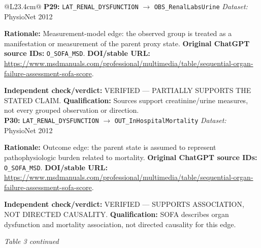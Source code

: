 \begin{tabular}{@{}L{23.4cm}@{}}
\addlinespace[2pt]
\midrule
\textbf{P29:} \nolinkurl{LAT_RENAL_DYSFUNCTION} $\rightarrow$ \nolinkurl{OBS_RenalLabsUrine} \hfill \textit{Dataset:} PhysioNet 2012\par\textbf{Rationale:} Measurement-model edge: the observed group is treated as a manifestation or measurement of the parent proxy state. \textbf{Original ChatGPT source IDs:} \nolinkurl{O_SOFA_MSD}. \textbf{DOI/stable URL:} \url{https://www.msdmanuals.com/professional/multimedia/table/sequential-organ-failure-assessment-sofa-score}.\par\textbf{Independent check/verdict:} VERIFIED --- PARTIALLY SUPPORTS THE STATED CLAIM. \textbf{Qualification:} Sources support creatinine/urine measures, not every grouped observation or direction. \\
\addlinespace[2pt]
\midrule
\textbf{P30:} \nolinkurl{LAT_RENAL_DYSFUNCTION} $\rightarrow$ \nolinkurl{OUT_InHospitalMortality} \hfill \textit{Dataset:} PhysioNet 2012\par\textbf{Rationale:} Outcome edge: the parent state is assumed to represent pathophysiologic burden related to mortality. \textbf{Original ChatGPT source IDs:} \nolinkurl{O_SOFA_MSD}. \textbf{DOI/stable URL:} \url{https://www.msdmanuals.com/professional/multimedia/table/sequential-organ-failure-assessment-sofa-score}.\par\textbf{Independent check/verdict:} VERIFIED --- SUPPORTS ASSOCIATION, NOT DIRECTED CAUSALITY. \textbf{Qualification:} SOFA describes organ dysfunction and mortality association, not directed causality for this edge. \\
\addlinespace[2pt]
\midrule
\bottomrule
\end{tabular}
\clearpage
\textit{Table 3 continued}\par

